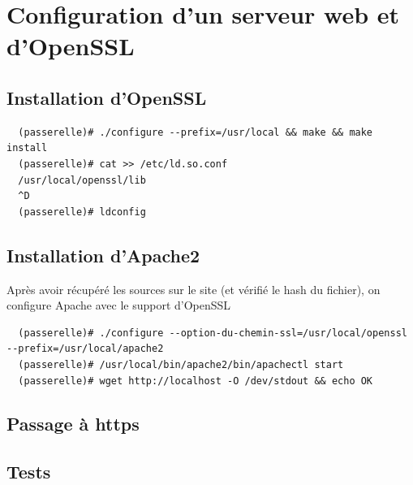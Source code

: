 \documentclass[a4paper]{article}
\begin{document}
\section{Configuration d'un serveur web et d'OpenSSL}
\subsection{Installation d'OpenSSL}
\begin{verbatim}
  (passerelle)# ./configure --prefix=/usr/local && make && make install
  (passerelle)# cat >> /etc/ld.so.conf
  /usr/local/openssl/lib
  ^D
  (passerelle)# ldconfig
\end{verbatim}

\subsection{Installation d'Apache2}
Après avoir récupéré les sources sur le site (et vérifié le hash du fichier), on configure
Apache avec le support d'OpenSSL
\begin{verbatim}
  (passerelle)# ./configure --option-du-chemin-ssl=/usr/local/openssl --prefix=/usr/local/apache2
  (passerelle)# /usr/local/bin/apache2/bin/apachectl start
  (passerelle)# wget http://localhost -O /dev/stdout && echo OK
\end{verbatim}

\subsection{Passage à https}

\subsection{Tests}
\end{document}
